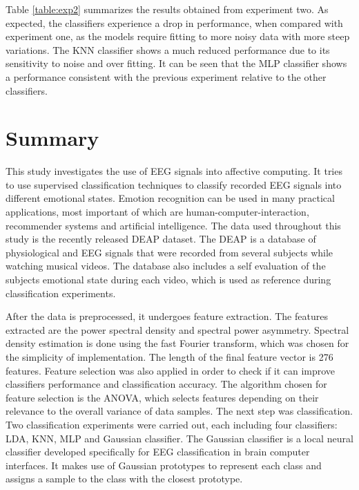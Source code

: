 \documentclass[12pt, a4paper, fleqn]{memoir}%
\begin{document}
Table \ref{table:exp2} summarizes the results obtained from experiment two. As expected, the classifiers experience a drop in performance, when compared with experiment one, as the models require fitting to more noisy data with more steep variations. The KNN classifier shows a much reduced performance due to its sensitivity to noise and over fitting. It can be seen that the MLP classifier shows a performance consistent with the previous experiment relative to the other classifiers. 
\chapter{Summary}
This study investigates the use of EEG signals into affective computing. It tries to use supervised classification techniques to classify recorded EEG signals into different emotional states. Emotion recognition can be used in many practical applications, most important of which are human-computer-interaction, recommender systems and artificial intelligence. The data used throughout this study is the recently released DEAP dataset. The DEAP is a database of physiological and EEG signals that were recorded from several subjects while watching musical videos. The database also includes a self evaluation of the subjects emotional state during each video, which is used as reference during classification experiments.

After the data is preprocessed, it undergoes feature extraction. The features extracted are the power spectral density and spectral power asymmetry. Spectral density estimation is done using the fast Fourier transform, which was chosen for the simplicity of implementation. The length of the final feature vector is 276 features. Feature selection was also applied in order to check if it can improve classifiers performance and classification accuracy. The algorithm chosen for feature selection is the ANOVA, which selects features depending on their relevance to the overall variance of data samples. The next step was classification. Two classification experiments were carried out, each including four classifiers: LDA, KNN, MLP and Gaussian classifier. The Gaussian classifier is a local neural classifier developed specifically for EEG classification in brain computer interfaces. It makes use of Gaussian prototypes to represent each class and assigns a sample to the class with the closest prototype. 
\end{document}
